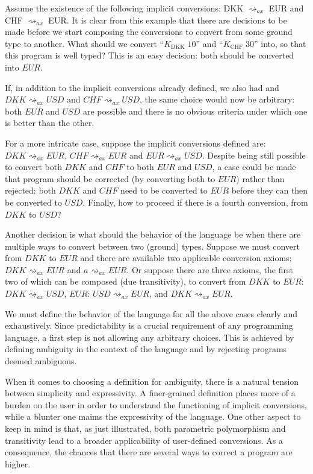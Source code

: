 Assume the existence of the following implicit conversions: DKK $\rightsquigarrow_{ax}$ EUR and CHF $\rightsquigarrow_{ax}$ EUR. It is clear from this example that there are decisions to be made before we start composing the conversions to convert from some ground type to another. What should we convert ``$K_{\text{DKK}}\;10$'' and ``$K_{\text{CHF}}\;30$'' into, so that this program is well typed? This is an easy decision: both should be converted into $EUR$.

If, in addition to the implicit conversions already defined, we also had and $DKK \rightsquigarrow_{ax} USD$ and $CHF \rightsquigarrow_{ax} USD$, the same choice would now be arbitrary: both $EUR$ and $USD$ are possible and there is no obvious criteria under which one is better than the other.

For a more intricate case, suppose the implicit conversions defined are: $DKK\rightsquigarrow_{ax}EUR$, $CHF\rightsquigarrow_{ax}EUR$ and $EUR \rightsquigarrow_{ax} USD$. Despite being still possible to convert both $DKK$ and $CHF$ to both $EUR$ and $USD$, a case could be made that program should be corrected (by converting both to $EUR$) rather than rejected: both $DKK$ and $CHF$ need to be converted to $EUR$ before they can then be converted to $USD$. Finally, how to proceed if there is a fourth conversion, from $DKK$ to $USD$?

Another decision is what should the behavior of the language be when there are multiple ways to convert between two (ground) types. Suppose we must convert from $DKK$ to $EUR$ and there are available two applicable conversion axioms: $DKK \rightsquigarrow_{ax} EUR$ and $a \rightsquigarrow_{ax} EUR$. Or suppose there are three axioms, the first two of which can be composed (due transitivity), to convert from $DKK$ to $EUR$: $DKK \rightsquigarrow_{ax} USD$, $EUR$: $USD \rightsquigarrow_{ax} EUR$, and $DKK \rightsquigarrow_{ax} EUR$.

We must define the behavior of the language for all the above cases clearly and exhaustively. Since predictability is a crucial requirement of any programming language, a first step is not allowing any arbitrary choices. This is achieved by defining ambiguity in the context of the language and by rejecting programs deemed ambiguous.

When it comes to choosing a definition for ambiguity, there is a natural tension between simplicity and expressivity. A finer-grained definition places more of a burden on the user in order to understand the functioning of implicit conversions, while a blunter one maims the expressivity of the language. One other aspect to keep in mind is that, as just illustrated, both parametric polymorphism and transitivity lead to a broader applicability of user-defined conversions. As a consequence, the chances that there are several ways to correct a program are higher.

